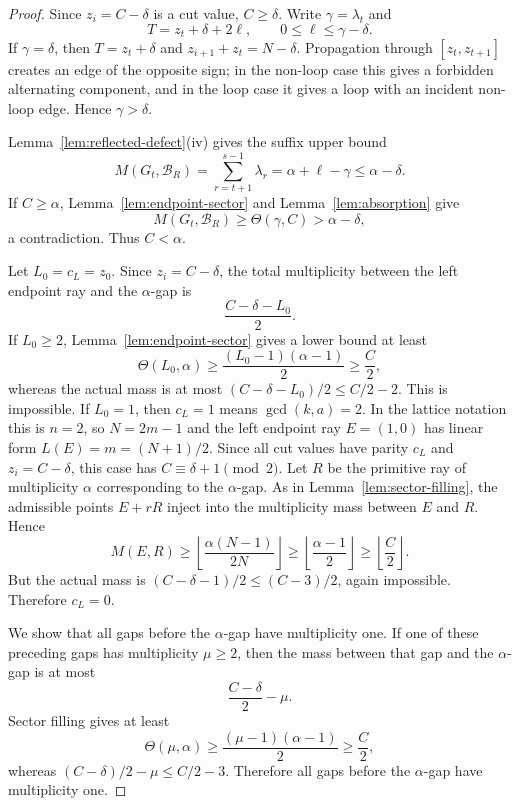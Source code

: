 \documentclass[11pt]{article}
\begin{document}
\begin{proof}
Since $z_i=C-\delta$ is a cut value, $C\ge\delta$.  Write $\gamma=\lambda_t$ and
\[
        T=z_t+\delta+2\ell,
        \qquad
        0\le \ell\le \gamma-\delta.
\]
If $\gamma=\delta$, then $T=z_t+\delta$ and $z_{i+1}+z_t=N-\delta$.  Propagation through $[z_t,z_{t+1}]$ creates an edge of the opposite sign; in the non-loop case this gives a forbidden alternating component, and in the loop case it gives a loop with an incident non-loop edge.  Hence $\gamma>\delta$.

Lemma~\ref{lem:reflected-defect}(iv) gives the suffix upper bound
\[
        M(G_t,\mathcal B_R)=\sum_{r=t+1}^{s-1}\lambda_r
        =\alpha+\ell-\gamma
        \le \alpha-\delta.
\]
If $C\ge \alpha$, Lemma~\ref{lem:endpoint-sector} and Lemma~\ref{lem:absorption} give
\[
        M(G_t,\mathcal B_R)\ge \Theta(\gamma,C)>\alpha-\delta,
\]
a contradiction.  Thus $C<\alpha$.

Let $L_0=c_L=z_0$.  Since $z_i=C-\delta$, the total multiplicity between the left endpoint ray and the $\alpha$-gap is
\[
        \frac{C-\delta-L_0}{2}.
\]
If $L_0\ge2$, Lemma~\ref{lem:endpoint-sector} gives a lower bound at least
\[
        \Theta(L_0,\alpha)
        \ge \frac{(L_0-1)(\alpha-1)}2
        \ge \frac{C}{2},
\]
whereas the actual mass is at most $(C-\delta-L_0)/2\le C/2-2$.  This is impossible.  If $L_0=1$, then $c_L=1$ means $\gcd(k,a)=2$.  In the lattice notation this is $n=2$, so $N=2m-1$ and the left endpoint ray $E=(1,0)$ has linear form $L(E)=m=(N+1)/2$.  Since all cut values have parity $c_L$ and $z_i=C-\delta$, this case has $C\equiv\delta+1\pmod 2$.  Let $R$ be the primitive ray of multiplicity $\alpha$ corresponding to the $\alpha$-gap.  As in Lemma~\ref{lem:sector-filling}, the admissible points $E+rR$ inject into the multiplicity mass between $E$ and $R$.  Hence
\[
        M(E,R)
        \ge
        \left\lfloor \frac{\alpha(N-1)}{2N}\right\rfloor
        \ge
        \left\lfloor\frac{\alpha-1}{2}\right\rfloor
        \ge
        \left\lfloor\frac C2\right\rfloor.
\]
But the actual mass is $(C-\delta-1)/2\le(C-3)/2$, again impossible.  Therefore $c_L=0$.

We show that all gaps before the $\alpha$-gap have multiplicity one.  If one of these preceding gaps has multiplicity $\mu\ge2$, then the mass between that gap and the $\alpha$-gap is at most
\[
        \frac{C-\delta}{2}-\mu.
\]
Sector filling gives at least
\[
        \Theta(\mu,\alpha)
        \ge
        \frac{(\mu-1)(\alpha-1)}2
        \ge
        \frac C2,
\]
whereas $(C-\delta)/2-\mu\le C/2-3$.  Therefore all gaps before the $\alpha$-gap have multiplicity one.
\end{proof}
\end{document}
